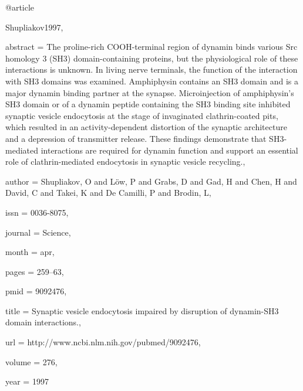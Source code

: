 @article{Shupliakov1997,

abstract = {The proline-rich COOH-terminal region of dynamin binds various Src homology 3 (SH3) domain-containing proteins, but the physiological role of these interactions is unknown. In living nerve terminals, the function of the interaction with SH3 domains was examined. Amphiphysin contains an SH3 domain and is a major dynamin binding partner at the synapse. Microinjection of amphiphysin's SH3 domain or of a dynamin peptide containing the SH3 binding site inhibited synaptic vesicle endocytosis at the stage of invaginated clathrin-coated pits, which resulted in an activity-dependent distortion of the synaptic architecture and a depression of transmitter release. These findings demonstrate that SH3-mediated interactions are required for dynamin function and support an essential role of clathrin-mediated endocytosis in synaptic vesicle recycling.},

author = {Shupliakov, O and L{\"{o}}w, P and Grabs, D and Gad, H and Chen, H and David, C and Takei, K and {De Camilli}, P and Brodin, L},

issn = {0036-8075},

journal = {Science},

month = {apr},

pages = {259--63},

pmid = {9092476},

title = {{Synaptic vesicle endocytosis impaired by disruption of dynamin-SH3 domain interactions.}},

url = {http://www.ncbi.nlm.nih.gov/pubmed/9092476},

volume = {276},

year = {1997}

}

